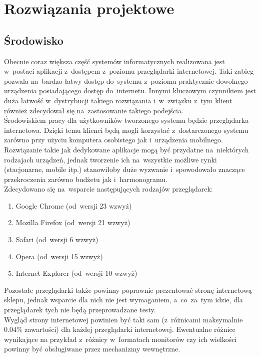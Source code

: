 \section{Rozwiązania projektowe}

\subsection {Środowisko}
Obecnie coraz większa część systemów informatycznych realizowana jest w~postaci aplikacji z~dostępem z~poziomu przeglądarki internetowej. Taki zabieg pozwala na~bardzo łatwy dostęp do~systemu z~poziomu praktycznie dowolnego urządzenia posiadającego dostęp do~internetu. Innymi kluczowym czynnikiem jest duża łatwość w~dystrybucji takiego rozwiązania i~w~związku z~tym klient również zdecydował się na~zastosowanie takiego podejścia.\\

Środowiskiem pracy dla użytkowników tworzonego systemu będzie przeglądarka internetowa. Dzięki temu klienci będą mogli korzystać z~dostarczonego systemu zarówno przy użyciu komputera osobistego jak i~urządzenia mobilnego. Rozwiązanie takie jak dedykowane aplikacje mogą być przydatne na~niektórych rodzajach urządzeń, jednak tworzenie ich na~wszystkie możliwe rynki (stacjonarne, mobile itp.) stanowiłoby duże wyzwanie i~spowodowało znaczące przekroczenia zarówno budżetu jak i~harmonogramu.\\

Zdecydowano się na~wsparcie następujących rodzajów przeglądarek:
\begin{enumerate}
  \item Google Chrome (od~wersji 23 wzwyż)
  \item Mozilla Firefox (od~wersji 21 wzwyż)
  \item Safari (od~wersji 6 wzwyż)
  \item Opera (od~wersji 15 wzwyż)
  \item Internet Explorer (od~wersji 10 wzwyż)
\end{enumerate}

Pozostałe przeglądarki także powinny poprawnie prezentować stronę internetową sklepu, jednak wsparcie dla nich nie jest wymaganiem, a~co~za~tym idzie, dla przeglądarek tych nie będą przeprowadzane testy.\\

Wygląd strony internetowej powinien być taki sam (z~różnicami maksymalnie 0.04\% zawartości) dla każdej przeglądarki internetowej. Ewentualne różnice wynikające na przykład z~różnicy w~formatach monitorów czy ich wielkości powinny być obsługiwane przez mechanizmy wewnętrzne.\\


